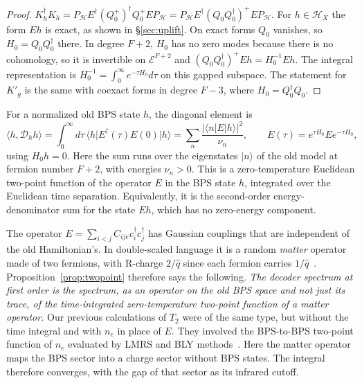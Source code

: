 \documentclass[11pt]{article}
\newcommand{\ip}[2]{\langle #1,#2\rangle}
\newcommand{\Hc}{\mathcal H}
\newcommand{\Ec}{\mathcal E}
\newcommand{\Kh}{K_h}
\newcommand{\Kg}{{K'_g}}
\theoremstyle{plain}
\theoremstyle{remark}
\numberwithin{equation}{section}
\begin{document}
\begin{proof}
$\Kh^\dagger\Kh=P_{\Hc}E^\dagger(Q_0^+)^\dagger Q_0^+EP_{\Hc}=P_{\Hc}E^\dagger(Q_0Q_0^\dagger)^+EP_{\Hc}$. For $h\in\Hc_X$ the
form $Eh$ is exact, as shown in \S\ref{sec:uplift}. On exact forms $Q_0$ vanishes, so $H_0=Q_0Q_0^\dagger$ there. In
degree $F+2$, $H_0$ has no zero modes because there is no cohomology, so it is invertible on $\Ec^{F+2}$ and
$(Q_0Q_0^\dagger)^+Eh=H_0^{-1}Eh$. The integral representation is $H_0^{-1}=\int_0^\infty e^{-\tau H_0}d\tau$ on this
gapped subspace. The statement for $\Kg$ is the same with coexact forms in degree $F-3$, where $H_0=Q_0^\dagger Q_0$.
\end{proof}

For a normalized old BPS state $h$, the diagonal element is
\begin{equation}\label{eq:twopoint}
\ip{h}{\mathcal D_h h}=\int_0^\infty d\tau\,\big\langle h\big|E^\dagger(\tau)E(0)\big|h\big\rangle
=\sum_{n}\frac{|\langle n|E|h\rangle|^2}{\nu_n},\qquad E(\tau)=e^{\tau H_0}Ee^{-\tau H_0},
\end{equation}
using $H_0h=0$. Here the sum runs over the eigenstates $|n\rangle$ of the old model at fermion number $F+2$, with
energies $\nu_n>0$. This is a zero-temperature Euclidean two-point function of the operator $E$ in the BPS state $h$,
integrated over the Euclidean time separation. Equivalently, it is the second-order energy-denominator sum for the state
$E h$, which has no zero-energy component.

The operator $E=\sum_{i<j}C_{ije}c_i^\dagger c_j^\dagger$ has Gaussian couplings that are independent of the old
Hamiltonian's. In double-scaled language it is a random \emph{matter} operator made of two fermions, with R-charge $2/\hat q$ since
each fermion carries $1/\hat q$~\cite{FGMS}. Proposition~\ref{prop:twopoint} therefore says the following. \emph{The decoder spectrum
at first order is the spectrum, as an operator on the old BPS space and not just its trace, of the time-integrated
zero-temperature two-point function of a matter operator.} Our previous calculations of $T_2$ were
of the same type, but without the time integral and with $n_e$ in place of $E$. They involved the BPS-to-BPS two-point
function of $n_e$ evaluated by LMRS and BLY methods~\cite{LMRS,BLY,prog0929}. Here the matter operator maps the BPS sector into
a charge sector without BPS states. The integral therefore converges, with the gap of that sector as its infrared
cutoff.
\end{document}
